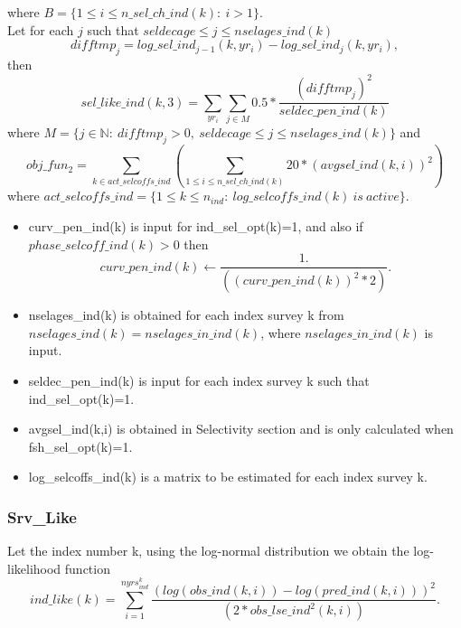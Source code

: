 \documentclass{article}
\begin{document}
\begin{itemize}
    where $B=\{1\leq i \leq n\_sel\_ch\_ind(k):\  i>1\}$.\\

    
    Let for each $j$ such that $seldecage \leq j \leq nselages\_ind(k)$
    \begin{equation}
        difftmp_j= log\_sel\_ind_{j-1}(k,yr_i)-log\_sel\_ind_j(k,yr_i),
    \end{equation}
     then
    \begin{equation}
sel\_like\_ind(k,3)    =\sum_{yr_i}\sum_{j\in M} 0.5*\dfrac{(difftmp_j )^2}{seldec\_pen\_ind(k)}
    \end{equation}
    where $M=\{j\in\mathbb{N}: \ difftmp_j>0, \ seldecage \leq j \leq nselages\_ind(k)\}$
    and 
    \begin{equation}
obj\_fun_2= \sum_{k\in act\_selcoffs\_ind}\left(\sum_{1\leq i \leq n\_sel\_ch\_ind(k)}20 * (avgsel\_ind(k,i))^2\right)
    \end{equation}
    where $act\_selcoffs\_ind=\{1\leq k \leq  n_{ind}: \ log\_selcoffs\_ind(k)\  is \ active\}$.
    \begin{itemize}
        \item curv\_pen\_ind(k) is input for ind\_sel\_opt(k)=1,  and also
        if $phase\_selcoff\_ind(k)>0$ then
        \begin{equation*}
    curv\_pen\_ind(k) \leftarrow \dfrac{1.} {({(curv\_pen\_ind(k))}^2*2)}.
        \end{equation*}
        \item nselages\_ind(k) is obtained for each index survey k from $nselages\_ind(k)=nselages\_in\_ind(k)$, where $nselages\_in\_ind(k)$ is input.
        \item seldec\_pen\_ind(k) is input for each index survey k such that ind\_sel\_opt(k)=1.
        \item avgsel\_ind(k,i) is obtained in Selectivity section  and is only calculated when fsh\_sel\_opt(k)=1. 
        \item log\_selcoffs\_ind(k) is a matrix to be estimated for each index survey k. 
    \end{itemize}
\end{itemize}







\subsubsection{Srv\_Like}
Let the index number k, using the log-normal distribution we obtain the log-likelihood function 
\begin{equation} 
ind\_like(k)=\sum_{i=1}^{nyrs_{ind}^k}\dfrac{(log(obs\_ind(k,i)) - log(pred\_ind(k,i)) )^2}{(2*obs\_lse\_ind^2
    (k,i))}.
\end{equation}
\end{document}
